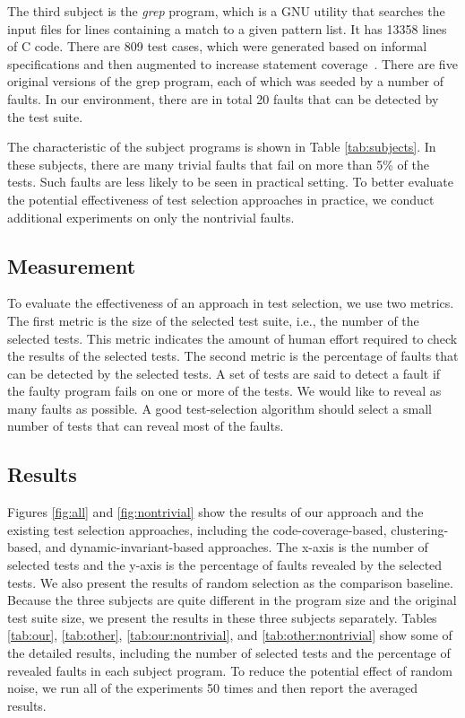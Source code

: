 \documentclass{sig-alternate}
\begin{document}
The third subject is the {\it grep} program, which is a GNU utility
that searches the input files for lines containing a match to a
given pattern list. It has 13358 lines of C code. There are 809 test
cases, which were generated based on informal specifications and
then augmented to increase statement coverage~\cite{SIR}. There are
five original versions of the grep program, each of which was seeded
by a number of faults. In our environment, there are in total 20
faults that can be detected by the test suite.


The characteristic of the subject programs is shown in Table
\ref{tab:subjects}. In these subjects, there are many trivial faults
that fail on more than 5\% of the tests. Such faults are less likely
to be seen in practical setting. To better evaluate the potential
effectiveness of test selection approaches in practice, we conduct
additional experiments on only the nontrivial faults.




\subsection{Measurement}



To evaluate the effectiveness of an approach in test selection, we
use two metrics. The first metric is the size of the selected test
suite, i.e., the number of the selected tests. This metric indicates
the amount of human effort required to check the results of the
selected tests. The second metric is the percentage of faults that
can be detected by the selected tests. A set of tests are said to
detect a fault if the faulty program fails on one or more of the
tests. We would like to reveal as many faults as possible. A good
test-selection algorithm should select a small number of tests that
can reveal most of the faults.



\subsection{Results}



Figures \ref{fig:all} and \ref{fig:nontrivial} show the results of
our approach and the existing test selection approaches, including
the code-coverage-based, clustering-based, and
dynamic-invariant-based approaches. The x-axis is the number of
selected tests and the y-axis is the percentage of faults revealed
by the selected tests. We also present the results of random
selection as the comparison baseline. Because the three subjects are
quite different in the program size and the original test suite
size, we present the results in these three subjects separately.
Tables \ref{tab:our}, \ref{tab:other}, \ref{tab:our:nontrivial}, and
\ref{tab:other:nontrivial} show some of the detailed results,
including the number of selected tests and the percentage of
revealed faults in each subject program. To reduce the potential
effect of random noise, we run all of the experiments 50 times and
then report the averaged results.
\end{document}
